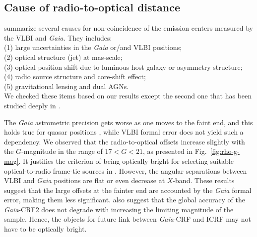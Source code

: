 \documentclass{aa}
\begin{document}
\subsection{Cause of radio-to-optical distance} \label{subsec:cause-of-VG}
%
    \citet{2017MNRAS.471.3775P} summarize several causes for non-coincidence of the emission centers measured by the VLBI and \textit{Gaia}.
    They includes:\\
    (1) large uncertainties in the \textit{Gaia} or/and VLBI positions;\\
    (2) optical structure (jet) at mas-scale; \\
    (3) optical position shift due to luminous host galaxy or asymmetry structure;\\
    (4) radio source structure and core-shift effect;\\
    (5) gravitational lensing and dual AGNs.\\
    We checked these items based on our results except the second one that has been studied deeply in \citet{2017A&A...598L...1K,2017MNRAS.467L..71P,2017MNRAS.471.3775P,2019MNRAS.482.3023P,2019ApJ...871..143P,2020MNRAS.493L..54K}. %

    The \textit{Gaia} astrometric precision gets worse as one moves to the faint end, and this holds true for quasar positions \citep{2016A&A...595A...5M,2018A&A...616A..14G}, while VLBI formal error does not yield such a dependency.
    We observed that the radio-to-optical offsets increase slightly with the $G$-magnitude in the range of $17<G<21$, as presented in Fig.~\ref{fig:rho-g-mag}.
    It justifies the criterion of being optically bright for selecting suitable optical-to-radio frame-tie sources in \citet{2008A&A...490..403B}.
    However, the angular separations between VLBI and \textit{Gaia} positions are flat or even decrease at $X$-band.
    These results suggest that the large offsets at the fainter end are accounted by the \textit{Gaia} formal error, making them less significant.
    \citet{2020A&A...634A..28L} also suggest that the global accuracy of the \textit{Gaia}-CRF2 does not degrade with increasing the limiting magnitude of the sample.
    Hence, the objects for future link between \textit{Gaia}-CRF and ICRF may not have to be optically bright.
\end{document}
